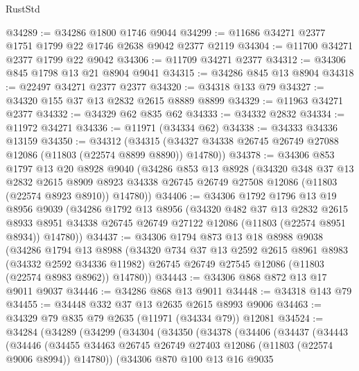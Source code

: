 \begin{lexlean}{RustStd}
\begin{coremodule}
@34289 := @34286 @1800 @1746 @9044
@34299 := @11686 @34271 @2377 @1751 @1799 @22 @1746 @2638 @9042 @2377 @2119
@34304 := @11700 @34271 @2377 @1799 @22 @9042
@34306 := @11709 @34271 @2377
@34312 := @34306 @845 @1798 @13 @21 @8904 @9041
@34315 := @34286 @845 @13 @8904
@34318 := @22497 @34271 @2377 @2377
@34320 := @34318 @133 @79
@34327 := @34320 @155 @37 @13 @2832 @2615 @8889 @8899
@34329 := @11963 @34271 @2377
@34332 := @34329 @62 @835 @62
@34333 := @34332 @2832
@34334 := @11972 @34271
@34336 := @11971 (@34334 @62)
@34338 := @34333 @34336 @13159
@34350 := @34312
    (@34315 (@34327 @34338 @26745 @26749 @27088 @12086 (@11803 (@22574 @8899 @8890)) @14780))
@34378 := @34306
    @853
    @1797
    @13
    @20
    @8928
    @9040
    (@34286
      @853
      @13
      @8928
      (@34320
        @348
        @37
        @13
        @2832
        @2615
        @8909
        @8923
        @34338
        @26745
        @26749
        @27508
        @12086
        (@11803 (@22574 @8923 @8910))
        @14780))
@34406 := @34306
    @1792
    @1796
    @13
    @19
    @8956
    @9039
    (@34286
      @1792
      @13
      @8956
      (@34320
        @482
        @37
        @13
        @2832
        @2615
        @8933
        @8951
        @34338
        @26745
        @26749
        @27122
        @12086
        (@11803 (@22574 @8951 @8934))
        @14780))
@34437 := @34306
    @1794
    @873
    @13
    @18
    @8988
    @9038
    (@34286
      @1794
      @13
      @8988
      (@34320
        @734
        @37
        @13
        @2592
        @2615
        @8961
        @8983
        (@34332 @2592 @34336 @11982)
        @26745
        @26749
        @27545
        @12086
        (@11803 (@22574 @8983 @8962))
        @14780))
@34443 := @34306 @868 @872 @13 @17 @9011 @9037
@34446 := @34286 @868 @13 @9011
@34448 := @34318 @143 @79
@34455 := @34448 @332 @37 @13 @2635 @2615 @8993 @9006
@34463 := @34329 @79 @835 @79 @2635 (@11971 (@34334 @79)) @12081
@34524 := @34284
    (@34289
      (@34299
        (@34304
          (@34350
            (@34378
              (@34406
                (@34437
                  (@34443
                    (@34446
                      (@34455
                        @34463
                        @26745
                        @26749
                        @27403
                        @12086
                        (@11803 (@22574 @9006 @8994))
                        @14780))
                    (@34306
                      @870
                      @100
                      @13
                      @16
                      @9035

\end{coremodule}
\end{lexlean}
